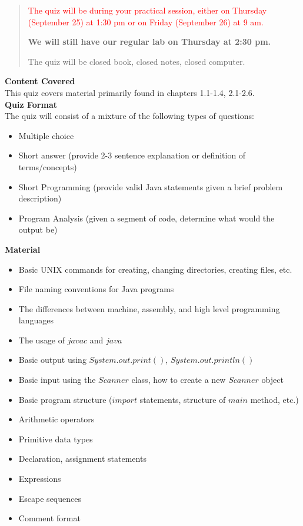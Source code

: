 

\thispagestyle{empty}

\begin{quote}
\textcolor{red}{The quiz will be during your practical session, either on Thursday (September 25) at 1:30 pm or on Friday (September 26) at 9 am. }

\textbf{We will still have our regular lab on Thursday at 2:30 pm.}

The quiz will be closed book, closed notes, closed computer. 

\end{quote}

\textbf{Content Covered} \\
This quiz covers material primarily found in chapters 1.1-1.4, 2.1-2.6. \\

\textbf{Quiz Format}\\
The quiz will consist of a mixture of the following types of questions:
\begin{itemize}
\item Multiple choice
\item Short answer (provide 2-3 sentence explanation or definition of terms/concepts)
\item Short Programming (provide valid Java statements given a brief problem description)
\item Program Analysis (given a segment of code, determine what would  the output be)
\end{itemize}

\textbf{Material}
\begin{itemize}
\item Basic UNIX commands for creating, changing directories, creating files, etc.
\item File naming conventions for Java programs
\item The differences between machine, assembly, and high level programming languages
\item The usage of $javac$ and $java$
\item Basic output using $System.out.print()$,  $System.out.println()$
\item Basic input using the $Scanner$ class, how to create a new $Scanner$ object
\item Basic program structure ($import$ statements, structure of $main$ method, etc.)
\item Arithmetic operators
\item Primitive data types
\item Declaration, assignment statements
\item Expressions
\item Escape sequences
\item Comment format 
\end{itemize}


